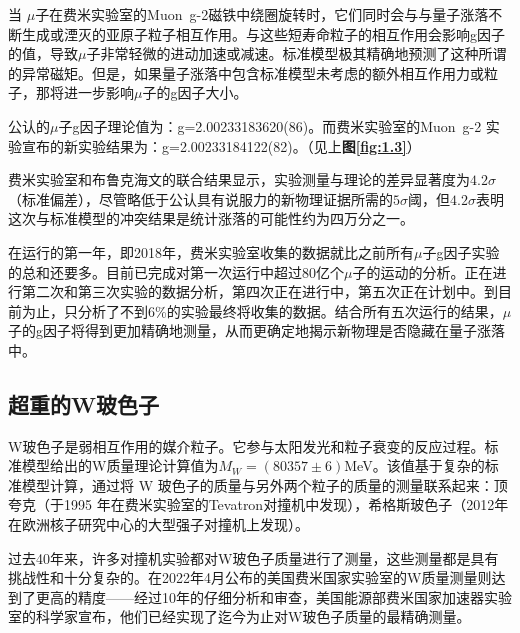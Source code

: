 当 $\mu$子在费米实验室的Muon\ g-2磁铁中绕圈旋转时，它们同时会与与量子涨落不断生成或湮灭的亚原子粒子相互作用。与这些短寿命粒子的相互作用会影响g因子的值，导致$\mu$子非常轻微的进动加速或减速。标准模型极其精确地预测了这种所谓的异常磁矩。但是，如果量子涨落中包含标准模型未考虑的额外相互作用力或粒子，那将进一步影响$\mu$子的g因子大小。

公认的$\mu$子g因子理论值为：g=2.00233183620(86)。而费米实验室的Muon\ g-2 实验宣布的新实验结果为：g=2.00233184122(82)。（见上\textbf{图\ref{fig:1.3}}）

费米实验室和布鲁克海文的联合结果显示，实验测量与理论的差异显著度为$4.2\sigma$（标准偏差），尽管略低于公认具有说服力的新物理证据所需的$5\sigma$阈，但$4.2\sigma$表明这次与标准模型的冲突结果是统计涨落的可能性约为四万分之一。

在运行的第一年，即2018年，费米实验室收集的数据就比之前所有$\mu$子g因子实验的总和还要多。目前已完成对第一次运行中超过80亿个$\mu$子的运动的分析。正在进行第二次和第三次实验的数据分析，第四次正在进行中，第五次正在计划中。到目前为止，只分析了不到6\%的实验最终将收集的数据。结合所有五次运行的结果，$\mu$子的g因子将得到更加精确地测量，从而更确定地揭示新物理是否隐藏在量子涨落中。

\subsection{超重的W玻色子}
W玻色子是弱相互作用的媒介粒子。它参与太阳发光和粒子衰变的反应过程。标准模型给出的W质量理论计算值为$M_W=(80357\pm6)$MeV。该值基于复杂的标准模型计算，通过将 W 玻色子的质量与另外两个粒子的质量的测量联系起来：顶夸克（于1995 年在费米实验室的Tevatron对撞机中发现\cite{top_quark_discovery}），希格斯玻色子（2012年在欧洲核子研究中心的大型强子对撞机上发现\cite{Higgs_discovery}）。

过去40年来，许多对撞机实验都对W玻色子质量进行了测量，这些测量都是具有挑战性和十分复杂的。在2022年4月公布的美国费米国家实验室的W质量测量则\cite{Wmass}达到了更高的精度——经过10年的仔细分析和审查，美国能源部费米国家加速器实验室的科学家宣布，他们已经实现了迄今为止对W玻色子质量的最精确测量。

